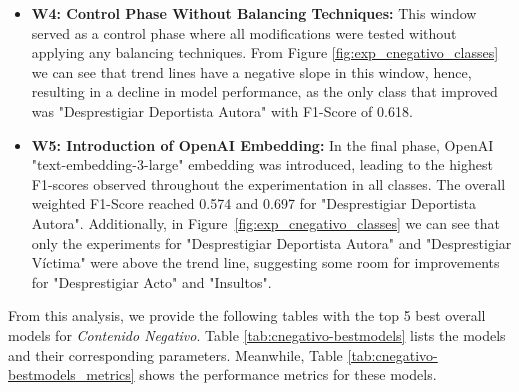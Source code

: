 \begin{itemize}
    \item \textbf{W4: Control Phase Without Balancing Techniques:} This window served as a control phase where all modifications were tested without applying any balancing techniques. From Figure \ref{fig:exp_cnegativo_classes} we can see that trend lines have a negative slope in this window, hence, resulting in a decline in model performance, as the only class that improved was "Desprestigiar Deportista Autora" with F1-Score of 0.618.


    \item \textbf{W5: Introduction of OpenAI Embedding:} In the final phase, OpenAI "text-embedding-3-large" embedding was introduced, leading to the highest F1-scores observed throughout the experimentation in all classes. The overall weighted F1-Score reached 0.574 and 0.697 for "Desprestigiar Deportista Autora". Additionally, in Figure~\ref{fig:exp_cnegativo_classes} we can see that only the experiments for "Desprestigiar Deportista Autora" and "Desprestigiar Víctima" were above the trend line, suggesting some room for improvements for "Desprestigiar Acto" and "Insultos".


\end{itemize}


From this analysis, we provide the following tables with the top 5 best overall models for \textit{Contenido Negativo}. Table \ref{tab:cnegativo-bestmodels} lists the models and their corresponding parameters. Meanwhile, Table \ref{tab:cnegativo-bestmodels_metrics} shows the performance metrics for these models.

